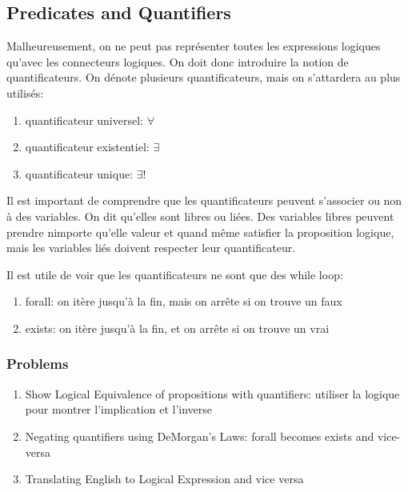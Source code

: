 \documentclass{article}
\begin{document}
\subsection{Predicates and Quantifiers}

Malheureusement, on ne peut pas représenter toutes les expressions logiques
qu'avec les connecteurs logiques. On doit donc introduire la notion
de quantificateurs. On dénote plusieurs quantificateurs, mais on s'attardera
au plus utilisés:
\begin{enumerate}
    \item quantificateur universel: $ \forall $
    \item quantificateur existentiel: $ \exists $
    \item quantificateur unique: $ \exists! $
\end{enumerate}

Il est important de comprendre que les quantificateurs peuvent s'associer
ou non à des variables. On dit qu'elles sont libres ou liées. Des variables
libres peuvent prendre nimporte qu'elle valeur et quand même satisfier
la proposition logique, mais les variables liés doivent respecter leur
quantificateur.

\begin{remark}
    Il est utile de voir que les quantificateurs ne sont que des while
    loop:
    \begin{enumerate}
        \item forall: on itère jusqu'à la fin, mais on arrête si on trouve
	    un faux
	\item exists: on itère jusqu'à la fin, et on arrête si on trouve
	    un vrai
    \end{enumerate}
\end{remark}

\subsubsection{Problems}

\begin{enumerate}
    \item Show Logical Equivalence of propositions with quantifiers:
	utiliser la logique pour montrer l'implication et l'inverse
    \item Negating quantifiers using DeMorgan's Laws: forall becomes
	exists and vice-versa
    \item Translating English to Logical Expression and vice versa
\end{enumerate}
\end{document}
